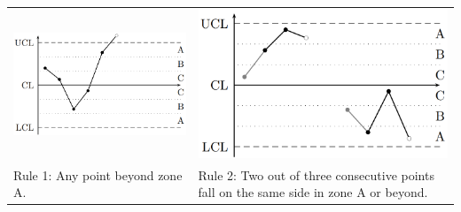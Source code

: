 \begin{table}[H]
  \setlength{\tabcolsep}{0.2em}
  \footnotesize
  \begin{tabular}{p{}@{\hskip 1em}p{}}
    \includegraphics[width=\linewidth]{Pics/3.1.1.png}& \includegraphics[width=\linewidth]{Pics/3.1.2.png} \\
    Rule 1: Any point beyond zone A. &
    Rule 2: Two out of three consecutive points fall on the same side in zone A or beyond.\\

\end{tabular}
\end{table}
